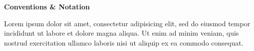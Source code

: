 
\clearpage
\begin{adjustwidth}{0.1\textwidth}{0.1\textwidth}
\begingroup
\null\vspace{0.2\textheight}
\begin{center}
{\bfseries\Large Conventions \& Notation}\par\vspace{2em}

Lorem ipsum dolor sit amet, consectetur adipisicing elit, sed do eiusmod tempor incididunt ut labore et dolore magna aliqua. Ut enim ad minim veniam, quis nostrud exercitation ullamco laboris nisi ut aliquip ex ea commodo consequat.
\end{center}
\endgroup
\end{adjustwidth}
\clearpage